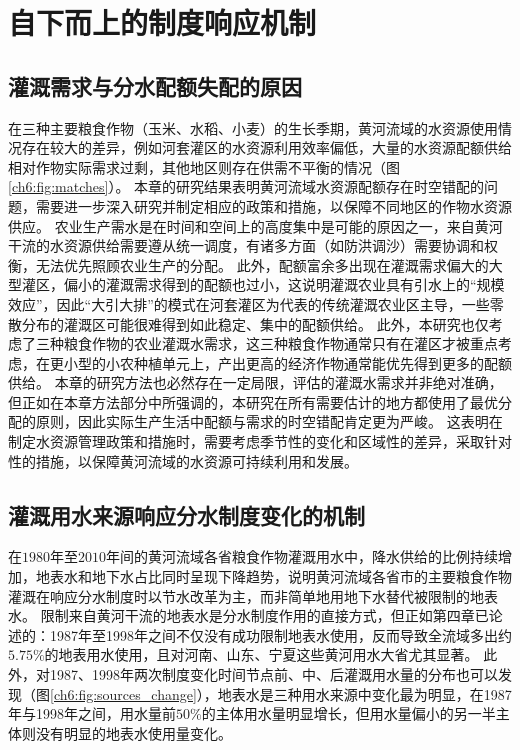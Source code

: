 \section{自下而上的制度响应机制}

\subsection{灌溉需求与分水配额失配的原因}

在三种主要粮食作物（玉米、水稻、小麦）的生长季期，黄河流域的水资源使用情况存在较大的差异，例如河套灌区的水资源利用效率偏低，大量的水资源配额供给相对作物实际需求过剩，其他地区则存在供需不平衡的情况（图\ref{ch6:fig:matches}）。
本章的研究结果表明黄河流域水资源配额存在时空错配的问题，需要进一步深入研究并制定相应的政策和措施，以保障不同地区的作物水资源供应。
农业生产需水是在时间和空间上的高度集中是可能的原因之一，来自黄河干流的水资源供给需要遵从统一调度，有诸多方面（如防洪调沙）需要协调和权衡，无法优先照顾农业生产的分配\cite{hu2015}。
此外，配额富余多出现在灌溉需求偏大的大型灌区，偏小的灌溉需求得到的配额也过小，这说明灌溉农业具有引水上的“规模效应”，因此“大引大排”的模式在河套灌区为代表的传统灌溉农业区主导，一些零散分布的灌溉区可能很难得到如此稳定、集中的配额供给\cite{xiong2021a}。
此外，本研究也仅考虑了三种粮食作物的农业灌溉水需求，这三种粮食作物通常只有在灌区才被重点考虑，在更小型的小农种植单元上，产出更高的经济作物通常能优先得到更多的配额供给。
本章的研究方法也必然存在一定局限，评估的灌溉水需求并非绝对准确，但正如在本章方法部分中所强调的，本研究在所有需要估计的地方都使用了最优分配的原则，因此实际生产生活中配额与需求的时空错配肯定更为严峻。
这表明在制定水资源管理政策和措施时，需要考虑季节性的变化和区域性的差异，采取针对性的措施，以保障黄河流域的水资源可持续利用和发展。


\subsection{灌溉用水来源响应分水制度变化的机制}

在$1980$年至$2010$年间的黄河流域各省粮食作物灌溉用水中，降水供给的比例持续增加，地表水和地下水占比同时呈现下降趋势，说明黄河流域各省市的主要粮食作物灌溉在响应分水制度时以节水改革为主，而非简单地用地下水替代被限制的地表水。
限制来自黄河干流的地表水是分水制度作用的直接方式，但正如第四章已论述的：1987年至1998年之间不仅没有成功限制地表水使用，反而导致全流域多出约$5.75\%$的地表用水使用，且对河南、山东、宁夏这些黄河用水大省尤其显著。
此外，对1987、1998年两次制度变化时间节点前、中、后灌溉用水量的分布也可以发现（图\ref{ch6:fig:sources_change}），地表水是三种用水来源中变化最为明显，在1987年与1998年之间，用水量前$50\%$的主体用水量明显增长，但用水量偏小的另一半主体则没有明显的地表水使用量变化。

